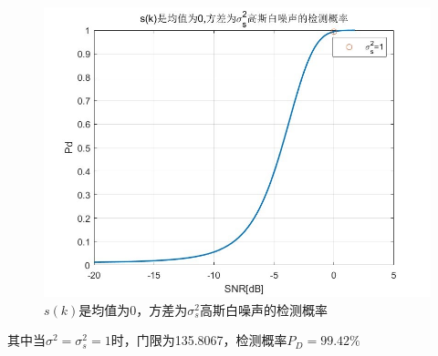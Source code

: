 \documentclass[fontset=windows]{article}
\numberwithin{figure}{section}
\begin{document}
\begin{figure}[H]
    \centering
    \includegraphics[scale=0.6]{fig4.3.jpg}
    \caption{\(s(k)\)是均值为0，方差为\(\sigma^2_s\)高斯白噪声的检测概率}
    \label{4.3}
\end{figure}

其中当\(\sigma^2=\sigma^2_s=1\)时，门限为135.8067，检测概率\(P_D=99.42\%\)


\end{document}
